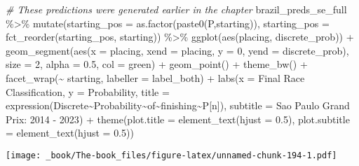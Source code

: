 \documentclass[
]{book}
\newenvironment{Shaded}{\begin{snugshade}}{\end{snugshade}}
\newcommand{\AttributeTok}[1]{\textcolor[rgb]{0.77,0.63,0.00}{#1}}
\newcommand{\CommentTok}[1]{\textcolor[rgb]{0.56,0.35,0.01}{\textit{#1}}}
\newcommand{\DecValTok}[1]{\textcolor[rgb]{0.00,0.00,0.81}{#1}}
\newcommand{\FloatTok}[1]{\textcolor[rgb]{0.00,0.00,0.81}{#1}}
\newcommand{\FunctionTok}[1]{\textcolor[rgb]{0.00,0.00,0.00}{#1}}
\newcommand{\NormalTok}[1]{#1}
\newcommand{\SpecialCharTok}[1]{\textcolor[rgb]{0.00,0.00,0.00}{#1}}
\newcommand{\StringTok}[1]{\textcolor[rgb]{0.31,0.60,0.02}{#1}}
\begin{document}
\begin{Shaded}
\begin{Highlighting}[]
\CommentTok{\# These predictions were generated earlier in the chapter}
\NormalTok{brazil\_preds\_se\_full }\SpecialCharTok{\%\textgreater{}\%}
  \FunctionTok{mutate}\NormalTok{(}\AttributeTok{starting\_pos =} \FunctionTok{as.factor}\NormalTok{(}\FunctionTok{paste0}\NormalTok{(}\StringTok{\textquotesingle{}P\textquotesingle{}}\NormalTok{,starting)),}
         \AttributeTok{starting\_pos =} \FunctionTok{fct\_reorder}\NormalTok{(starting\_pos, starting)) }\SpecialCharTok{\%\textgreater{}\%}
  \FunctionTok{ggplot}\NormalTok{(}\FunctionTok{aes}\NormalTok{(placing, discrete\_prob)) }\SpecialCharTok{+}
  \FunctionTok{geom\_segment}\NormalTok{(}\FunctionTok{aes}\NormalTok{(}\AttributeTok{x =}\NormalTok{ placing, }\AttributeTok{xend =}\NormalTok{ placing, }\AttributeTok{y =} \DecValTok{0}\NormalTok{, }\AttributeTok{yend =}\NormalTok{ discrete\_prob),}
               \AttributeTok{size =} \DecValTok{2}\NormalTok{, }\AttributeTok{alpha =} \FloatTok{0.5}\NormalTok{, }\AttributeTok{col =} \StringTok{\textquotesingle{}green\textquotesingle{}}\NormalTok{) }\SpecialCharTok{+}
  \FunctionTok{geom\_point}\NormalTok{() }\SpecialCharTok{+}
  \FunctionTok{theme\_bw}\NormalTok{() }\SpecialCharTok{+}
  \FunctionTok{facet\_wrap}\NormalTok{(}\SpecialCharTok{\textasciitilde{}}\NormalTok{ starting, }\AttributeTok{labeller =}\NormalTok{ label\_both) }\SpecialCharTok{+}
  \FunctionTok{labs}\NormalTok{(}\AttributeTok{x =} \StringTok{\textquotesingle{}Final Race Classification\textquotesingle{}}\NormalTok{,}
       \AttributeTok{y =} \StringTok{\textquotesingle{}Probability\textquotesingle{}}\NormalTok{,}
       \AttributeTok{title =} \FunctionTok{expression}\NormalTok{(Discrete}\SpecialCharTok{\textasciitilde{}}\NormalTok{Probability}\SpecialCharTok{\textasciitilde{}}\NormalTok{of}\SpecialCharTok{\textasciitilde{}}\NormalTok{finishing}\SpecialCharTok{\textasciitilde{}}\NormalTok{P[n]),}
       \AttributeTok{subtitle =} \StringTok{\textquotesingle{}Sao Paulo Grand Prix: 2014 {-} 2023\textquotesingle{}}\NormalTok{) }\SpecialCharTok{+}
  \FunctionTok{theme}\NormalTok{(}\AttributeTok{plot.title =} \FunctionTok{element\_text}\NormalTok{(}\AttributeTok{hjust =} \FloatTok{0.5}\NormalTok{),}
        \AttributeTok{plot.subtitle =} \FunctionTok{element\_text}\NormalTok{(}\AttributeTok{hjust =} \FloatTok{0.5}\NormalTok{)) }
\end{Highlighting}
\end{Shaded}

\texttt{[image: \_book/The-book\_files/figure-latex/unnamed-chunk-194-1.pdf]}
\end{document}
